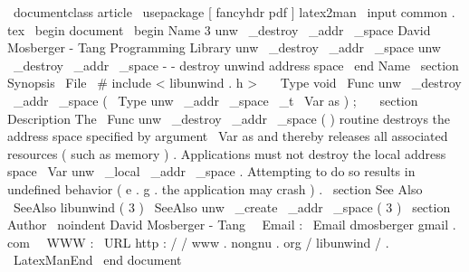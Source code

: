 \
documentclass
{
article
}
\
usepackage
[
fancyhdr
pdf
]
{
latex2man
}
\
input
{
common
.
tex
}
\
begin
{
document
}
\
begin
{
Name
}
{
3
}
{
unw
\
_destroy
\
_addr
\
_space
}
{
David
Mosberger
-
Tang
}
{
Programming
Library
}
{
unw
\
_destroy
\
_addr
\
_space
}
unw
\
_destroy
\
_addr
\
_space
-
-
destroy
unwind
address
space
\
end
{
Name
}
\
section
{
Synopsis
}
\
File
{
\
#
include
<
libunwind
.
h
>
}
\
\
\
Type
{
void
}
\
Func
{
unw
\
_destroy
\
_addr
\
_space
}
(
\
Type
{
unw
\
_addr
\
_space
\
_t
}
\
Var
{
as
}
)
;
\
\
\
section
{
Description
}
The
\
Func
{
unw
\
_destroy
\
_addr
\
_space
}
(
)
routine
destroys
the
address
space
specified
by
argument
\
Var
{
as
}
and
thereby
releases
all
associated
resources
(
such
as
memory
)
.
Applications
must
not
destroy
the
local
address
space
\
Var
{
unw
\
_local
\
_addr
\
_space
}
.
Attempting
to
do
so
results
in
undefined
behavior
(
e
.
g
.
the
application
may
crash
)
.
\
section
{
See
Also
}
\
SeeAlso
{
libunwind
(
3
)
}
\
SeeAlso
{
unw
\
_create
\
_addr
\
_space
(
3
)
}
\
section
{
Author
}
\
noindent
David
Mosberger
-
Tang
\
\
Email
:
\
Email
{
dmosberger
gmail
.
com
}
\
\
WWW
:
\
URL
{
http
:
/
/
www
.
nongnu
.
org
/
libunwind
/
}
.
\
LatexManEnd
\
end
{
document
}
